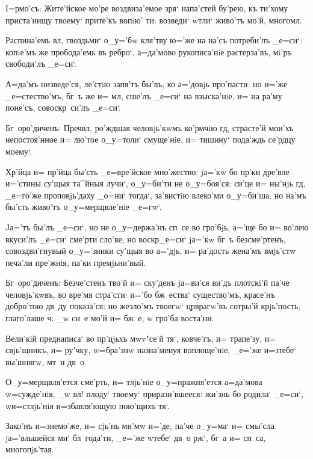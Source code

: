 
I=рмо'съ: Жите'йское мо'ре воздвиза'емое зря` 
напа'стей бу'рею, къ ти'хому приста'нищу твоему` прите'къ 
вопiю' ти: возведи` w\т тли` живо'тъ мо'й, многомл.

Распина'емь вл, гвоздьми` о_у='бw кля'тву ю='же на 
на'съ потреби'лъ _е=си`: копiе'мъ же пробода'емь въ 
ребро`, а=да'мово рукописа'нiе растерза'въ, мi'ръ 
свободи'лъ _е=си`.

А=да'мъ низведе'ся, ле'стiю запя'тъ бы'въ, ко а='довjь 
про'пасти: но и='же _е=стество'мъ, бг~ъ же и= мл, 
сше'лъ _е=си` на взыска'нiе, и= на ра'му поне'съ, 
совоскр~си'лъ _е=си`.

Бг~оро'диченъ: Преч вл, ро'ждшая 
человjь'кwмъ ко'рмчiю гд, страсте'й мои'хъ 
непостоя'нное и= лю'тое о_у=толи` смуще'нiе, и= тишину` 
пода'ждь се'рдцу моему`. 


Хр'йца и= пр'йца бы'сть _е=вре'йское 
мно'жество: jа='кw бо пр'ки дре'вле и='стины су'щыя 
та^йныя лучи`, о_у=би'ти не о_у=боя'ся: си'це и= ны'нjь 
гд, _е=го'же проповjь'даху _о=ни` тогда`, за'вистiю 
влеко'ми о_у=би'ша. но на'мъ бы'сть живо'тъ 
о_у=мерщвле'нiе _е=гw`.

Jа='тъ бы'лъ _е=си`, но не о_у=держа'нъ сп~се во 
гро'бjь, а='ще бо и= во'лею вкуси'лъ _е=си` сме'рти 
сло'ве, но воскр _е=си` jа='кw бг~ъ безсме'ртенъ, 
совоздви'гнувый о_у='зники су'щыя во а='дjь, и= ра'дость 
жена'мъ вмjь'стw печа'ли пре'жнiя, па'ки премjьни'вый.

Бг~оро'диченъ: Безче'стенъ тво'й и= ску'денъ jа=ви'ся 
ви'дъ плотскi'й па'че человjь'кwвъ, во вре'мя стра'сти: 
и='бо бж~ества` существо'мъ, красе'нъ добро'тою дв~ду 
показа'ся: но жезло'мъ твоегw` цр врагw'въ сотры'й 
крjь'пость, глаго'лаше ч: _w сн~е мо'й и= бж~е, w\т 
гро'ба воста'ни.


Вели'кiй преднаписа` во пр'цjьхъ мwv"се'й тя`, 
ковче'гъ, и= трапе'зу, и= свjь'щникъ, и= ру'чку, 
w=бра'знw назна'менуя воплоще'нiе, _е='же и=з\ъ тебе` 
вы'шнягw, мт~и дв~о.

О_у=мерщвля'ется сме'рть, и= тлjь'нiе о_у=пражня'ется 
а=да'мова w=сужде'нiя, _w вл! плоду` твоему` 
прирази'вшееся: жи'знь бо родила` _е=си`, w\т и=стлjь'нiя 
и=збавля'ющую пою'щихъ тя`.

Зако'нъ и=знемо'же, и= сjь'нь ми'мw и='де, па'че 
о_у=ма` и= смы'сла jа='вльшейся ми` бл~года'ти, _е='же 
w\т тебе` дв~о рж`, бг~а и= сп~са, многопjь'тая.

